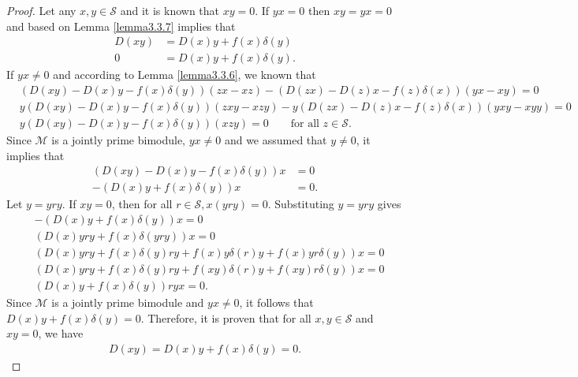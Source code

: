 \documentclass[10pt,a4paper]{amsart}
\begin{document}
\begin{proof}
     Let any $x,y \in \mathcal{S}$ and it is known that $xy = 0$. If $yx = 0$ then $xy=yx = 0$ and based on Lemma \ref{lemma3.3.7} implies that 
     \begin{align*}
         D(xy) & =D(x)y + f(x)\delta (y)\\
        0 &= D(x)y + f(x)\delta (y).
     \end{align*}
     If $yx \ne 0$ and according to Lemma \ref{lemma3.3.6}, we known that
     \begin{align*}
         &(D(xy)-D(x)y-f(x)\delta(y))(zx-xz) - (D(zx)-D(z)x-f(z)\delta (x)) (yx-xy)=0\\
         &y(D(xy)-D(x)y-f(x)\delta (y))(zxy-xzy) - y(D(zx)-D(z)x-f(z)\delta (x))(yxy-xyy)=0\\
         &y(D(xy)-D(x)y-f(x)\delta(y))(xzy)=0 \quad \quad \text{for all } z \in \mathcal{S}.
     \end{align*}
     Since $\mathcal{M}$ is a jointly prime bimodule, $yx \ne 0$ and we assumed that $y \ne 0$, it implies that
     \begin{align*}
         (D(xy)-D(x)y-f(x)\delta (y))x &= 0\\
          -(D(x)y+f(x)\delta (y))x &= 0.
     \end{align*}
     Let $y = yry$. If $xy = 0$, then for all $r \in \mathcal{S}, x(yry)=0$. Substituting $y = yry$ gives
     \begin{align*}
          &-(D(x)y+f(x)\delta (y))x=0\\
          &(D(x)yry+f(x)\delta (yry))x = 0\\
          & (D(x)yry + f(x)\delta (y)ry+f(x)y\delta (r)y + f(x)yr\delta (y))x = 0\\
          &(D(x)yry+f(x)\delta(y)ry+f(xy)\delta (r)y+f(xy)r \delta(y))x = 0\\
          &(D(x)y+f(x)\delta(y))ryx = 0.
     \end{align*}
     Since $\mathcal{M}$ is a jointly prime bimodule and $yx \ne 0$, it follows that $D(x)y + f(x)\delta (y) = 0$. Therefore, it is proven that for all $x,y \in \mathcal{S}$ and $xy=0$, we have
     \begin{align*}
         D(xy)=D(x)y+ f(x)\delta (y)=0.
     \end{align*}
\end{proof}
\end{document}

